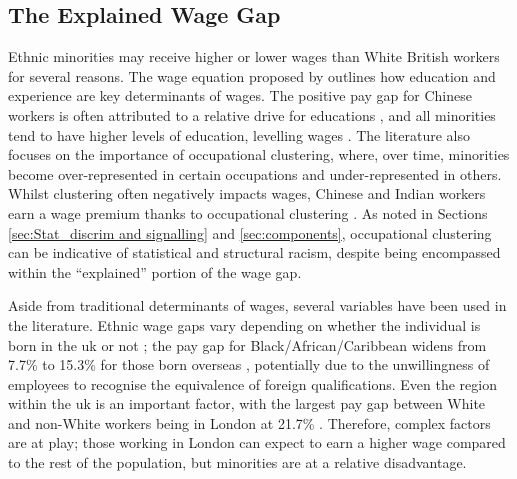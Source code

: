 \documentclass[class=article, crop=false]{standalone}
\begin{document}
\subsection{The Explained Wage Gap}
Ethnic minorities may receive higher or lower wages than White British workers for several reasons. The wage equation proposed by \citet{MincerA} outlines how education and experience are key determinants of wages. The positive pay gap for Chinese workers is often attributed to a relative drive for educations \citep{Leslie, Berthoud}, and all minorities tend to have higher levels of education, levelling wages \citep{Longhi2}. The literature also focuses on the importance of occupational clustering, where, over time, minorities become over-represented in certain occupations and under-represented in others. Whilst clustering often negatively impacts wages, Chinese and Indian workers earn a wage premium thanks to occupational clustering \citep{Brynin}. As noted in Sections \ref{sec:Stat_discrim and signalling} and \ref{sec:components}, occupational clustering can be indicative of statistical and structural racism, despite being encompassed within the \enquote{explained} portion of the wage gap.

Aside from traditional determinants of wages, several variables have been used in the literature. Ethnic wage gaps vary depending on whether the individual is born in the \acrshort{uk} or not \citep{Brynin, ONSe, Shields}; the pay gap for Black/African/Caribbean widens from 7.7\% to 15.3\% for those born overseas \citep{ONSe}, potentially due to the unwillingness of employees to recognise the equivalence of foreign qualifications. Even the region within the \acrshort{uk} is an important factor, with the largest pay gap between White and non-White workers being in London at 21.7\% \citep{ONSe}. Therefore, complex factors are at play; those working in London can expect to earn a higher wage compared to the rest of the population, but minorities are at a relative disadvantage.

\end{document}
